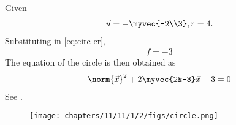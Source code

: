 Given
\begin{align}
	\vec{u} = -\myvec{-2\\3},  r = 4.
\end{align}
Substituting in 
	\eqref{eq:circ-cr},
\begin{align}
	f = -3
\end{align}
The equation of the circle is then obtained as
\begin{align}
	\norm{\vec{x}}^2 + 2\myvec{2&-3}\vec{x} -3=0     		       
\end{align}	
See  
.
\begin{figure}[H]
	\begin{center} 
	    \texttt{[image: chapters/11/11/1/2/figs/circle.png]}
	\end{center}
\caption{}
\label{fig:chapters/11/11/1/2/Fig1}
\end{figure}

